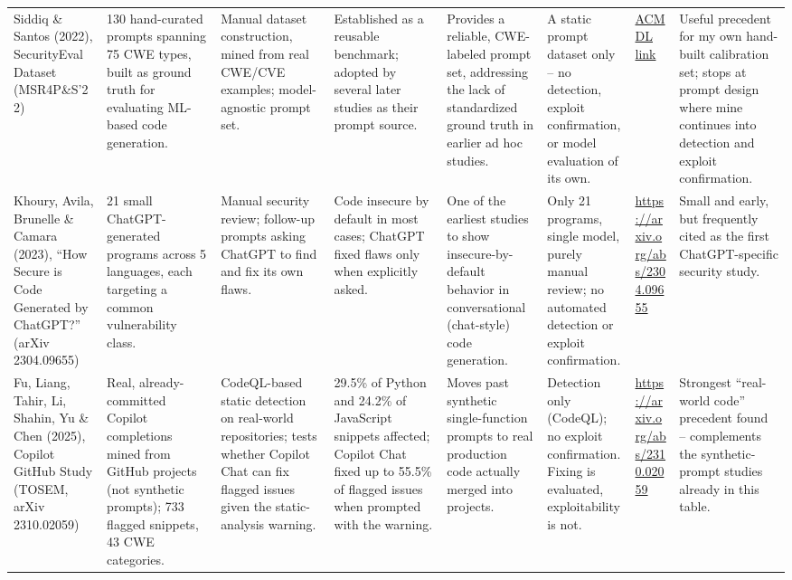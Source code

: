 \documentclass[10pt]{article}
\begin{document}
\begin{landscape}
\begin{longtable}{
  P{2.6cm}
  P{3.6cm}
  P{3.2cm}
  P{4.0cm}
  P{3.0cm}
  P{3.0cm}
  P{2.2cm}
  P{3.6cm}
}
Siddiq \& Santos (2022), SecurityEval Dataset (MSR4P\&S'22)
&
130 hand-curated prompts spanning 75 CWE types, built as ground truth for evaluating ML-based code generation.
&
Manual dataset construction, mined from real CWE/CVE examples; model-agnostic prompt set.
&
Established as a reusable benchmark; adopted by several later studies as their prompt source.
&
Provides a reliable, CWE-labeled prompt set, addressing the lack of standardized ground truth in earlier ad hoc studies.
&
A static prompt dataset only -- no detection, exploit confirmation, or model evaluation of its own.
&
\href{https://doi.org/10.1145/3549035.3561184}{ACM DL link}
&
Useful precedent for my own hand-built calibration set; stops at prompt design where mine continues into detection and exploit confirmation.
\\[4pt]

Khoury, Avila, Brunelle \& Camara (2023), ``How Secure is Code Generated by ChatGPT?'' (arXiv 2304.09655)
&
21 small ChatGPT-generated programs across 5 languages, each targeting a common vulnerability class.
&
Manual security review; follow-up prompts asking ChatGPT to find and fix its own flaws.
&
Code insecure by default in most cases; ChatGPT fixed flaws only when explicitly asked.
&
One of the earliest studies to show insecure-by-default behavior in conversational (chat-style) code generation.
&
Only 21 programs, single model, purely manual review; no automated detection or exploit confirmation.
&
\url{https://arxiv.org/abs/2304.09655}
&
Small and early, but frequently cited as the first ChatGPT-specific security study.
\\[4pt]

Fu, Liang, Tahir, Li, Shahin, Yu \& Chen (2025), Copilot GitHub Study (TOSEM, arXiv 2310.02059)
&
Real, already-committed Copilot completions mined from GitHub projects (not synthetic prompts); 733 flagged snippets, 43 CWE categories.
&
CodeQL-based static detection on real-world repositories; tests whether Copilot Chat can fix flagged issues given the static-analysis warning.
&
29.5\% of Python and 24.2\% of JavaScript snippets affected; Copilot Chat fixed up to 55.5\% of flagged issues when prompted with the warning.
&
Moves past synthetic single-function prompts to real production code actually merged into projects.
&
Detection only (CodeQL); no exploit confirmation. Fixing is evaluated, exploitability is not.
&
\url{https://arxiv.org/abs/2310.02059}
&
Strongest ``real-world code'' precedent found -- complements the synthetic-prompt studies already in this table.
\\[4pt]


\end{longtable}
\end{landscape}
\end{document}
